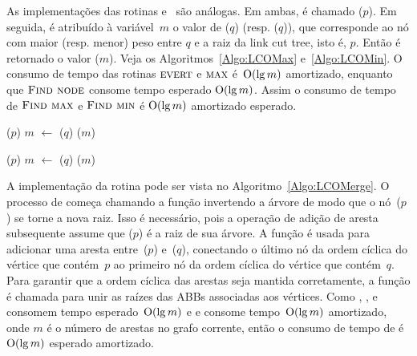 As implementações das rotinas \LCOMax{} e~\LCOMin{} são análogas.
Em ambas, é chamado \linkcutEvert($p$).
Em seguida, é atribuído à variável~$m$ o valor de \linkcutMax($q$) (resp. \linkcutMin($q$)), que corresponde ao nó com maior (resp. menor) peso entre $q$ e a raiz da link cut tree, isto é, $p$.
Então é retornado o valor \LCOFindNode($m$).
Veja os Algoritmos~\ref{Algo:LCOMax} e~\ref{Algo:LCOMin}.
O consumo de tempo das rotinas $\text{\scshape \text{\scshape evert}}$ e $\text{\scshape \text{\scshape max}}$ é~$\mathrm{O}(\lg m)$ amortizado, enquanto que $\text{\scshape Find node}$ consome tempo esperado $\mathrm{O}(\lg m)$. Assim o consumo de tempo de $\text{\scshape \text{\scshape Find max}}$ e $\text{\scshape \text{\scshape Find min}}$ é $\mathrm{O}(\lg m)$ amortizado esperado.


\begin{minipage}{0.4\textwidth}
\begin{algorithm}[H]
\caption{\LCOMax($p$, $q$)}
\label{Algo:LCOMax}
\begin{algorithmic}[1]
\State \linkcutEvert($p$)
\State $m$ $\gets$ \linkcutMax($q$)
\State \Return \LCOFindNode($m$)
\end{algorithmic}
\end{algorithm}
\end{minipage}
\hfill
\begin{minipage}{0.4\textwidth}
\begin{algorithm}[H]
\caption{\LCOMin($p$, $q$)}
\label{Algo:LCOMin}
\begin{algorithmic}[1]
\State \linkcutEvert($p$)
\State $m$ $\gets$ \linkcutMin($q$)
\State \Return \LCOFindNode($m$)
\end{algorithmic}
\end{algorithm}
\end{minipage}



A implementação da rotina \LCOMerge{} pode ser vista no Algoritmo~\ref{Algo:LCOMerge}.
O processo de \LCOMerge{} começa chamando a função \linkcutEvert{} invertendo a árvore de modo que o nó~\treapLast($p$) se torne a nova raiz.
Isso é necessário, pois a operação \linkcutAddEdge{} de adição de aresta subsequente assume que \treapLast($p$) é a raiz de sua árvore.
A função \linkcutAddEdge{} é usada para adicionar uma aresta entre~\treapLast($p$) e~\treapFirst($q$), conectando o último nó da ordem cíclica do vértice que contém~$p$ ao primeiro nó da ordem cíclica do vértice que contém~$q$.
Para garantir que a ordem cíclica das arestas seja mantida corretamente, a função \treapJoin{} é chamada para unir as raízes das ABBs associadas aos vértices.
Como \treapFirst{}, \treapLast{}, \treapGetRoot{} e \treapJoin{} consomem tempo esperado~$\mathrm{O}(\lg m)$ e \linkcutEvert{} e \linkcutAddEdge{} consome tempo~$\mathrm{O}(\lg m)$ amortizado, onde $m$ é o número de arestas no grafo corrente, então o consumo de tempo de \LCOMerge{} é~$\mathrm{O}(\lg m)$ esperado amortizado.


